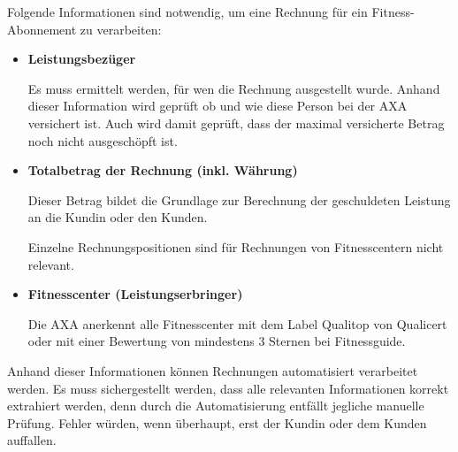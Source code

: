 
%    
%    
%    
%    

\newpage
Folgende Informationen sind notwendig, um eine Rechnung für ein Fitness-Abonnement zu verarbeiten:

\nopagebreak
\begin{itemize}
    \item \textbf{Leistungsbezüger}
    
    Es muss ermittelt werden, für wen die Rechnung ausgestellt wurde. Anhand dieser Information wird geprüft ob und wie diese Person bei der AXA versichert ist. Auch wird damit geprüft, dass der maximal versicherte Betrag noch nicht ausgeschöpft ist.
    \item \textbf{Totalbetrag der Rechnung (inkl. Währung)}
    
    Dieser Betrag bildet die Grundlage zur Berechnung der geschuldeten Leistung an die Kundin oder den Kunden. 
    
    Einzelne Rechnungspositionen sind für Rechnungen von Fitnesscentern nicht relevant.
    \item \textbf{Fitnesscenter (Leistungserbringer)}
    
    Die AXA anerkennt alle Fitnesscenter mit dem Label Qualitop von Qualicert oder mit einer Bewertung von mindestens 3 Sternen bei Fitnessguide.
\end{itemize}

Anhand dieser Informationen können Rechnungen automatisiert verarbeitet werden. Es muss sichergestellt werden, dass alle relevanten Informationen korrekt extrahiert werden, denn durch die Automatisierung entfällt jegliche manuelle Prüfung. Fehler würden, wenn überhaupt, erst der Kundin oder dem Kunden auffallen. 

